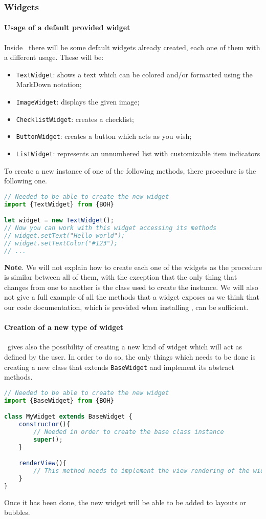 \subsubsection{Widgets}

\paragraph{Usage of a default provided widget}
Inside \progettoShort\ there will be some default widgets already created, each one of them with a different usage. These will be:
\begin{itemize}
	\item \texttt{TextWidget}: shows a text which can be colored and/or formatted using the MarkDown notation;
	\item \texttt{ImageWidget}: displays the given image;
	\item \texttt{ChecklistWidget}: creates a checklist;
	\item \texttt{ButtonWidget}: creates a button which acts as you wish;
	\item \texttt{ListWidget}: represents an unnumbered list with customizable item indicators
\end{itemize}

To create a new instance of one of the following methods, there procedure is the following one. 
\begin{lstlisting}[language=JavaScript, frame=single]
// Needed to be able to create the new widget
import {TextWidget} from {BOH}

let widget = new TextWidget();
// Now you can work with this widget accessing its methods
// widget.setText("Hello world");
// widget.setTextColor("#123");
// ...
\end{lstlisting}


\textbf{Note}. We will not explain how to create each one of the widgets as the procedure is similar between all of them, with the exception that the only thing that changes from one to another is the class used to create the instance. We will also not give a full example of all the methods that a widget exposes as we think that our code documentation, which is provided when installing \progettoShort, can be sufficient.

\paragraph{Creation of a new type of widget}
\progettoShort\ gives also the possibility of creating a new kind of widget which will act as defined by the user. In order to do so, the only things which needs to be done is creating a new class that extends \texttt{BaseWidget} and implement its abstract methods.
 \begin{lstlisting}[language=JavaScript, frame=single]
// Needed to be able to create the new widget
import {BaseWidget} from {BOH}

class MyWidget extends BaseWidget {
    constructor(){
        // Needed in order to create the base class instance
        super();
    }

    renderView(){
        // This method needs to implement the view rendering of the widget
    }
}
\end{lstlisting}

Once it has been done, the new widget will be able to be added to layouts or bubbles.